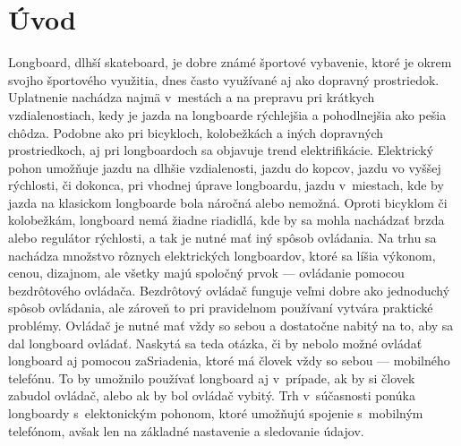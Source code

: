%



\chapter{Úvod}\label{uvod}

Longboard, dlhší skateboard, je dobre známé športové vybavenie, ktoré je okrem svojho športového využitia, dnes často využívané aj ako dopravný prostriedok. 
Uplatnenie nachádza najmä v~mestách a na prepravu pri krátkych vzdialenostiach, kedy je jazda na longboarde rýchlejšia a pohodlnejšia ako pešia chôdza. 
Podobne ako pri bicykloch, kolobežkách a iných dopravných prostriedkoch, aj pri longboardoch sa objavuje trend elektrifikácie. 
Elektrický pohon umožňuje jazdu na dlhšie vzdialenosti, jazdu do kopcov, jazdu vo vyššej rýchlosti, či dokonca, pri vhodnej úprave longboardu, jazdu v~miestach, kde by jazda na klasickom longboarde bola náročná alebo nemožná.
Oproti bicyklom či kolobežkám, longboard nemá žiadne riadidlá, kde by sa mohla nachádzať brzda alebo regulátor rýchlosti, a tak je nutné mať iný spôsob ovládania. 
Na trhu sa nachádza množstvo rôznych elektrických longboardov, ktoré sa líšia výkonom, cenou, dizajnom, ale všetky majú spoločný prvok --- ovládanie pomocou bezdrôtového ovládača.
Bezdrôtový ovládač funguje veľmi dobre ako jednoduchý spôsob ovládania, ale zároveň to pri pravidelnom používaní vytvára praktické problémy.
Ovládač je nutné mať vždy so sebou a dostatočne nabitý na to, aby sa dal longboard ovládať.
Naskytá sa teda otázka, či by nebolo možné ovládať longboard aj pomocou zaSriadenia, ktoré má človek vždy so sebou --- mobilného telefónu.
To by umožnilo používať longboard aj v~prípade, ak by si človek zabudol ovládač, alebo ak by bol ovládač vybitý.
Trh v~súčasnosti ponúka longboardy s~elektonickým pohonom, ktoré umožňujú spojenie s~mobilným telefónom, avšak len na základné nastavenie a sledovanie údajov.

